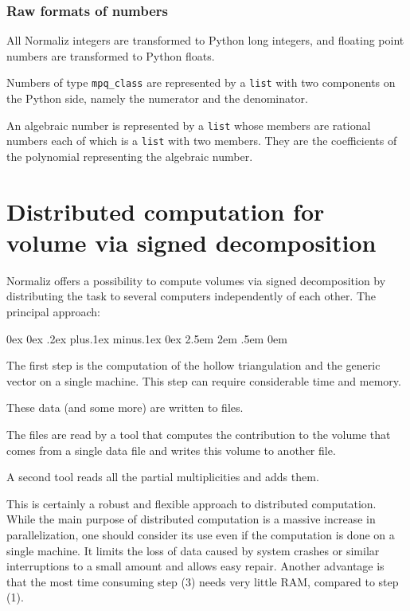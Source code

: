 \documentclass[12pt,a4paper]{scrartcl}
\newcounter{listi}
\newcommand{\stdli}{ \topsep0ex \partopsep0ex %
\parsep.2ex plus.1ex minus.1ex \itemsep0ex%
\leftmargin2.5em \labelwidth2em \labelsep.5em \rightmargin0em}%
\newenvironment{arab}{\begin{list}{\textup{(\arabic{listi})}}%
	{\usecounter{listi}\stdli}}{\end{list}}
\theoremstyle{definition}
\begin{document}
\begin{small}
\subsubsection{Raw formats of numbers}

All Normaliz integers are transformed to Python long integers, and floating point numbers are transformed to Python floats.

Numbers of type \verb|mpq_class| are represented by a \verb|list| with two components on the Python side, namely the numerator and the denominator.

An algebraic number is represented by a \verb|list| whose members are rational numbers each of which is a \verb|list| with two members. They are the coefficients of the polynomial representing the algebraic number.

\end{small}

\section{Distributed computation for volume via signed decomposition}\label{distr_comp}

Normaliz offers a possibility to compute volumes via signed decomposition by distributing the task to several computers independently of each other. The principal approach:
\begin{arab}
\item The first step is the computation of the hollow triangulation and the generic vector on a single machine. This step can require considerable time and memory.
\item These data (and some more) are written to files.
\item The files are read by a tool that computes the contribution to the volume that comes from a single data file and writes this volume to another file.
\item A second tool reads all the partial multiplicities and adds them.
\end{arab}

This is certainly a  robust and flexible approach to distributed computation. While the main purpose of distributed computation is a massive increase in parallelization, one should consider its use even if the computation is done on a single machine. It limits the loss of data caused by system crashes or similar interruptions to a small amount and allows easy repair. Another advantage is that the most time consuming step (3) needs very little RAM, compared to step (1). 
\end{document}
